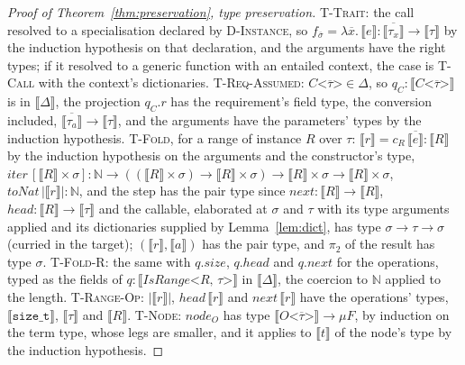 \begin{proof}[Proof of Theorem~\ref{thm:preservation}, type preservation]
\textsc{T-Trait}: the call resolved to a specialisation declared by \textsc{D-Instance}, so $f_{\overline{\sigma}} = \lambda\overline{x}.\,\llbracket e \rrbracket : \overline{\llbracket \tau_x \rrbracket} \to \llbracket \tau \rrbracket$ by the induction hypothesis on that declaration, and the arguments have the right types; if it resolved to a generic function with an entailed context, the case is \textsc{T-Call} with the context's dictionaries.
\textsc{T-Req-Assumed}: $C\texttt{<}\overline{\tau}\texttt{>} \in \Delta$, so $q_C : \llbracket C\texttt{<}\overline{\tau}\texttt{>} \rrbracket$ is in $\llbracket \Delta \rrbracket$, the projection $q_C.r$ has the requirement's field type, the conversion included, $\overline{\llbracket \tau_a \rrbracket} \to \llbracket \tau \rrbracket$, and the arguments have the parameters' types by the induction hypothesis.
\textsc{T-Fold}, for a range of instance $R$ over $\tau$: $\llbracket r \rrbracket = c_R\,\overline{\llbracket e \rrbracket} : \llbracket R \rrbracket$ by the induction hypothesis on the arguments and the constructor's type, $\mathit{iter}\,[\llbracket R \rrbracket \times \sigma] : \mathbb{N} \to ((\llbracket R \rrbracket \times \sigma) \to \llbracket R \rrbracket \times \sigma) \to \llbracket R \rrbracket \times \sigma \to \llbracket R \rrbracket \times \sigma$, $\mathit{toNat}\,|\llbracket r \rrbracket| : \mathbb{N}$, and the step has the pair type since $\mathit{next} : \llbracket R \rrbracket \to \llbracket R \rrbracket$, $\mathit{head} : \llbracket R \rrbracket \to \llbracket \tau \rrbracket$ and the callable, elaborated at $\sigma$ and $\tau$ with its type arguments applied and its dictionaries supplied by Lemma~\ref{lem:dict}, has type $\sigma \to \tau \to \sigma$ (curried in the target); $(\llbracket r \rrbracket, \llbracket a \rrbracket)$ has the pair type, and $\pi_2$ of the result has type $\sigma$.
\textsc{T-Fold-R}: the same with $q.\mathit{size}$, $q.\mathit{head}$ and $q.\mathit{next}$ for the operations, typed as the fields of $q : \llbracket \mathit{IsRange}\texttt{<}R\texttt{, }\tau\texttt{>} \rrbracket$ in $\llbracket \Delta \rrbracket$, the coercion to $\mathbb{N}$ applied to the length.
\textsc{T-Range-Op}: $|\llbracket r \rrbracket|$, $\mathit{head}\,\llbracket r \rrbracket$ and $\mathit{next}\,\llbracket r \rrbracket$ have the operations' types, $\llbracket \texttt{size\_t} \rrbracket$, $\llbracket \tau \rrbracket$ and $\llbracket R \rrbracket$.
\textsc{T-Node}: $\mathit{node}_{O}$ has type $\llbracket O\texttt{<}\overline{\tau}\texttt{>} \rrbracket \to \mu F$, by induction on the term type, whose legs are smaller, and it applies to $\llbracket t \rrbracket$ of the node's type by the induction hypothesis.

\end{proof}
